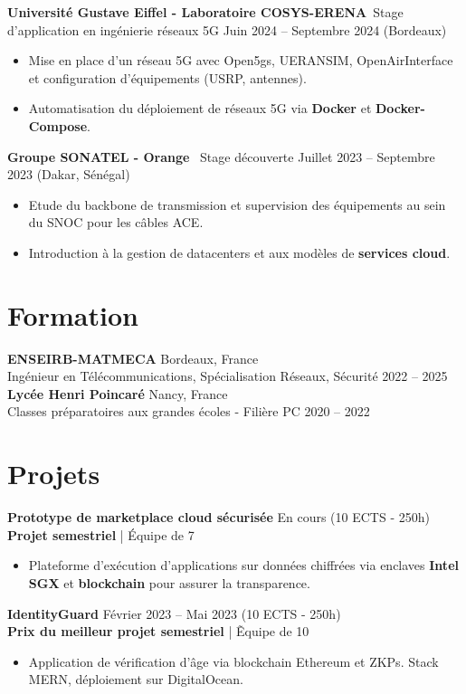 \documentclass[letterpaper,10pt]{article}
\begin{document}
\textbf{Universit\'e Gustave Eiffel - Laboratoire COSYS-ERENA}\
Stage d'application en ing\'enierie r\'eseaux 5G \hfill Juin 2024 -- Septembre 2024 (Bordeaux)
\begin{itemize}[leftmargin=0.15in]
\item Mise en place d'un r\'eseau 5G avec Open5gs, UERANSIM, OpenAirInterface et configuration d’\'equipements (USRP, antennes).
\item Automatisation du d\'eploiement de r\'eseaux 5G via \textbf{Docker} et \textbf{Docker-Compose}.
\end{itemize}

\textbf{Groupe SONATEL - Orange} \
Stage d\'ecouverte \hfill Juillet 2023 -- Septembre 2023 (Dakar, S\'en\'egal)
\begin{itemize}[leftmargin=0.15in]
\item Etude du backbone de transmission et supervision des \'equipements au sein du SNOC pour les c\^ables ACE.
\item Introduction \`a la gestion de datacenters et aux mod\`eles de \textbf{services cloud}.
\end{itemize}

\section{Formation}
\textbf{ENSEIRB-MATMECA} \hfill Bordeaux, France\\
Ing\'enieur en T\'el\'ecommunications, Sp\'ecialisation R\'eseaux, S\'ecurit\'e \hfill 2022 -- 2025 \\
\textbf{Lyc\'ee Henri Poincar\'e} \hfill Nancy, France\\
Classes pr\'eparatoires aux grandes \'ecoles - Fili\`ere PC \hfill 2020 -- 2022

\section{Projets}

\textbf{Prototype de marketplace cloud s\'ecuris\'ee} \hfill En cours (10 ECTS - 250h)\\
\textbf{Projet semestriel }| \'Equipe de 7
\begin{itemize}[leftmargin=0.15in]
\item Plateforme d’ex\'ecution d’applications sur donn\'ees chiffr\'ees via enclaves \textbf{Intel SGX} et \textbf{blockchain} pour assurer la transparence.
\end{itemize}

\textbf{IdentityGuard} \hfill F\'evrier 2023 -- Mai 2023 (10 ECTS - 250h)\\
\textbf{Prix du meilleur projet semestriel} | \~Equipe de 10
\begin{itemize}[leftmargin=0.15in]
\item Application de v\'erification d’\^age via blockchain Ethereum et ZKPs. Stack MERN, d\'eploiement sur DigitalOcean.
\end{itemize}
\end{document}
